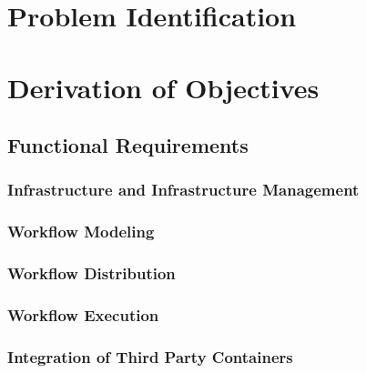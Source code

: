\documentclass[language=english,noinputenc]{wiwwuwordrprt}
\begin{document}
    \section{Problem Identification} %
    \label{sec:problem_identification}
    

    \section{Derivation of Objectives} %
    \label{sec:derivation_of_objectives}

      \subsection{Functional Requirements} %
      \label{sub:functional_requirements}

        \subsubsection{Infrastructure and Infrastructure Management} %
        \label{ssub:infrastructure_management}
        

        \subsubsection{Workflow Modeling} %
        \label{ssub:workflow_modeling}
        
        
        \subsubsection{Workflow Distribution} %
        \label{ssub:workflow_distribution}
        

        \subsubsection{Workflow Execution} %
        \label{ssub:workflow_execution}
        

        \subsubsection{Integration of Third Party Containers} %
        \label{ssub:integration_of_third_party_containers}
        
\end{document}
